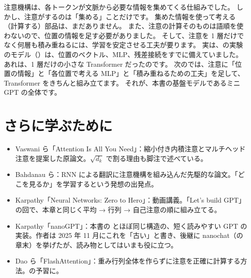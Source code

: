 注意機構は、各トークンが文脈から必要な情報を集めてくる仕組みでした。
しかし、注意がするのは「集める」ことだけです。
集めた情報を使って考える（計算する）部品は、まだありません。
また、注意の計算そのものは語順を使わないので、位置の情報を足す必要がありました。
そして、注意を 1 層だけでなく何層も積み重ねるには、学習を安定させる工夫が要ります。
実は、の実験のモデル（）は、位置のベクトル、MLP、残差接続をすでに備えていました。
あれは、1 層だけの小さな Transformer だったのです。
次のでは、注意に「位置の情報」と「各位置で考える MLP」と「積み重ねるための工夫」を足して、Transformer をきちんと組み立てます。
それが、本書の基盤モデルであるミニGPT の全体です。

\section*{さらに学ぶために}

\begin{itemize}
\item Vaswani ら「Attention Is All You Need」\cite{vaswani2017attention}：縮小付き内積注意とマルチヘッド注意を提案した原論文。$\sqrt{d_k}$ で割る理由も脚注で述べている。
\item Bahdanau ら\cite{bahdanau2015neural}：RNN による翻訳に注意機構を組み込んだ先駆的な論文。「どこを見るか」を学習するという発想の出発点。
\item Karpathy「Neural Networks: Zero to Hero」\cite{karpathy2022zerotohero}：動画講義。「Let's build GPT」の回で、本章と同じく平均 → 行列 → 自己注意の順に組み立てる。
\item Karpathy「nanoGPT」\cite{karpathy2022nanogpt}：本書の  とほぼ同じ構造の、短く読みやすい GPT の実装。作者は 2025 年 11 月にこれを「古い」と書き、後継に nanochat（の章末）を挙げたが、読み物としてはいまも役に立つ。
\item Dao ら「FlashAttention」\cite{dao2022flashattention}：重み行列全体を作らずに注意を正確に計算する方法。の予習に。
\end{itemize}

